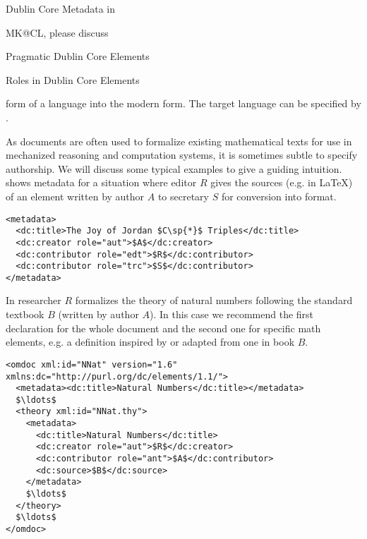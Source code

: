 \begin{module}[id=dc-elements]
\begin{omgroup}[id=dc-elements]{Dublin Core Metadata in \omdoc}
\begin{newpart}{MK@CL, please discuss}
\begin{omgroup}{Pragmatic Dublin Core Elements}
\begin{omgroup}[id=dc-roles]{Roles in Dublin Core Elements}
\begin{description}
  form of a language into the modern form. The target language can be specified by
  .
\end{description}
As \omdoc documents are often used to formalize existing mathematical texts for use in
mechanized reasoning and computation systems, it is sometimes subtle to specify
authorship.  We will discuss some typical examples to give a guiding intuition.
{} shows metadata for a situation where editor $R$ gives the sources
(e.g. in {\LaTeX}) of an element written by author $A$ to secretary $S$ for conversion
into \omdoc format.
\begin{lstlisting}[label=lst:sec-edt,mathescape,
  caption={A Document with Editor ({\snippet{edt}}) and  Transcriber ({\snippet{trc}})},
  index={metadata,dc:title,dc:creator,dc:contributor}]
<metadata>
  <dc:title>The Joy of Jordan $C\sp{*}$ Triples</dc:title>
  <dc:creator role="aut">$A$</dc:creator>
  <dc:contributor role="edt">$R$</dc:contributor>
  <dc:contributor role="trc">$S$</dc:contributor>
</metadata>
\end{lstlisting}

In {} researcher $R$ formalizes the theory of natural numbers
following the standard textbook $B$ (written by author $A$). In this case we
recommend the first declaration for the whole document and the second one for
specific math elements, e.g. a definition inspired by or adapted from one in book
$B$.

\begin{lstlisting}[label=lst:formalize,mathescape,
  caption={A Formalization with Scientific Antecedent ({\snippet{ant}})},
  index={metadata,dc:title,dc:creator}]
<omdoc xml:id="NNat" version="1.6" xmlns:dc="http://purl.org/dc/elements/1.1/">
  <metadata><dc:title>Natural Numbers</dc:title></metadata>                              
  $\ldots$
  <theory xml:id="NNat.thy">
    <metadata>
      <dc:title>Natural Numbers</dc:title>
      <dc:creator role="aut">$R$</dc:creator>
      <dc:contributor role="ant">$A$</dc:contributor>
      <dc:source>$B$</dc:source>
    </metadata>
    $\ldots$
  </theory>
  $\ldots$
</omdoc>
\end{lstlisting} 
\end{omgroup}
\end{omgroup}
\end{newpart}
\end{omgroup}
\end{module}


